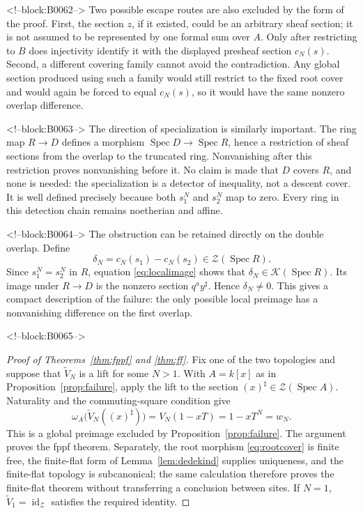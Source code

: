 \documentclass[11pt]{article}
\theoremstyle{definition}
\newcommand{\Spec}{\operatorname{Spec}}
\newcommand{\Zsh}{\mathcal Z}
\newcommand{\Ksh}{\mathcal K}
\newcommand{\sh}{\sharp}
\begin{document}
<!--block:B0062-->
Two possible escape routes are also excluded by the form of the proof.
First, the section \(z\), if it existed, could be an arbitrary sheaf
section; it is not assumed to be represented by one formal sum over
\(A\).  Only after restricting to \(B\) does injectivity identify it with
the displayed presheaf section \(c_N(s)\).  Second, a different covering
family cannot avoid the contradiction.  Any global section produced using
such a family would still restrict to the fixed root cover and would again
be forced to equal \(c_N(s)\), so it would have the same nonzero overlap
difference.

<!--block:B0063-->
The direction of specialization is similarly important.  The ring map
\(R\to D\) defines a morphism \(\Spec D\to\Spec R\), hence a restriction of
sheaf sections from the overlap to the truncated ring.  Nonvanishing after
this restriction proves nonvanishing before it.  No claim is made that
\(D\) covers \(R\), and none is needed: the specialization is a detector
of inequality, not a descent cover.
It is well defined precisely because both \(s_1^N\) and \(s_2^N\) map to
zero.  Every ring in this detection chain remains noetherian and affine.

<!--block:B0064-->
The obstruction can be retained directly on the double overlap.  Define
\[
 \delta_N=c_N(s_1)-c_N(s_2)\in\Zsh(\Spec R).
 \tag{4.14}\label{eq:delta}
\]
Since \(s_1^N=s_2^N\) in \(R\), equation \eqref{eq:localimage} shows that
\(\delta_N\in\Ksh(\Spec R)\).  Its image under \(R\to D\) is the nonzero
section \(q^a y^\sh\).  Hence \(\delta_N\ne0\).  This gives a compact
description of the failure: the only possible local preimage has a
nonvanishing difference on the first overlap.

<!--block:B0065-->
\begin{proof}[Proof of Theorems~\ref{thm:fppf} and \ref{thm:ff}]
Fix one of the two topologies and suppose that
\(\widetilde V_N\) is a lift for some \(N>1\).  With \(A=k[x]\) as in
Proposition~\ref{prop:failure}, apply the lift to the section
\((x)^\sh\in\Zsh(\Spec A)\).  Naturality and the commuting-square
condition give
\[
 \omega_A\bigl(\widetilde V_N((x)^\sh)\bigr)
  =V_N(1-xT)=1-xT^N=w_N.
\]
This is a global preimage excluded by Proposition~\ref{prop:failure}.
The argument proves the fppf theorem.  Separately, the root morphism
\eqref{eq:rootcover} is finite free, the finite-flat form of
Lemma~\ref{lem:dedekind} supplies uniqueness, and the finite-flat topology
is subcanonical; the same calculation therefore proves the finite-flat
theorem without transferring a conclusion between sites.  If \(N=1\),
\(\widetilde V_1=\operatorname{id}_{\Zsh}\) satisfies the required
identity.
\end{proof}
\end{document}
